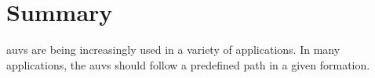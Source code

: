 \chapter*{Summary}

\Glspl{auv} are being increasingly used in a variety of applications.
In many applications, the \glspl{auv} should follow a predefined path in a given formation.
